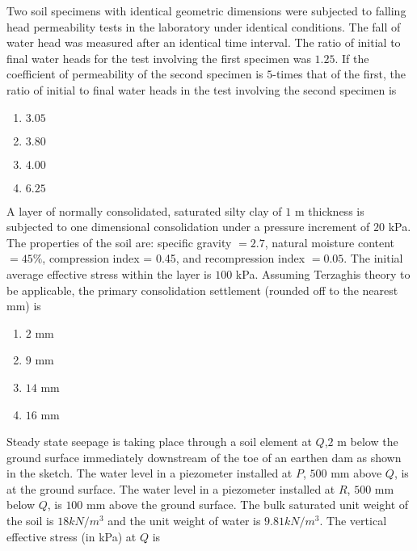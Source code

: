 \item Two soil specimens with identical geometric dimensions were subjected to falling head permeability tests in the laboratory under identical conditions. The fall of water head was measured after an identical time interval. The ratio of initial to final water heads for the test involving the first specimen was $1.25$. If the coefficient of permeability of the second specimen is $5$-times that of the first, the ratio of initial to final water heads in the test involving the second specimen is
\begin{multicols}{4}
    \begin{enumerate}
        \item $3.05$
        \item $3.80$
        \item $4.00$
        \item $6.25$
    \end{enumerate}
\end{multicols}
\item A layer of normally consolidated, saturated silty clay of $1$ m thickness is subjected to one dimensional consolidation under a pressure increment of $20$ kPa. The properties of the soil are:
specific gravity $= 2.7$, natural moisture content$ = 45\%$, compression index = 0.45, and
recompression index $= 0.05$. The initial average effective stress within the layer is $100$ kPa.
Assuming Terzaghis theory to be applicable, the primary consolidation settlement (rounded off to the nearest mm) is
\begin{enumerate}
    \item $2$ mm
    \item $9$ mm
    \item $14$ mm
    \item $16$ mm
\end{enumerate}
\item Steady state seepage is taking place through a soil element at $Q$,$2$ m below the ground surface immediately downstream of the
toe of an earthen dam as shown in the sketch. The water level in a piezometer installed at $P$, $500$ mm above $Q$, is at the ground surface. The water level in a piezometer installed at $R$, $500$ mm below $Q$, is $100$ mm above the ground surface. The bulk saturated unit weight of the soil is $18 kN/m^3$ and the unit weight of water is $9.81 kN/m^3$. The vertical effective stress (in kPa) at $Q$ is
